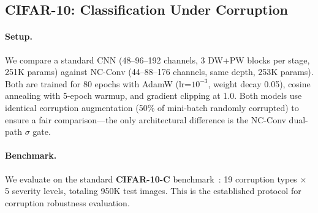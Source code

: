 \documentclass{bmvc2k}
\begin{document}
\subsection{CIFAR-10: Classification Under Corruption}

\paragraph{Setup.}
We compare a standard CNN (48--96--192 channels, 3 DW+PW blocks per stage, 251K params) against NC-Conv (44--88--176 channels, same depth, 253K params).
Both are trained for 80 epochs with AdamW (lr=$10^{-3}$, weight decay 0.05), cosine annealing with 5-epoch warmup, and gradient clipping at 1.0.
Both models use identical corruption augmentation (50\% of mini-batch randomly corrupted) to ensure a fair comparison---the only architectural difference is the NC-Conv dual-path $\sigma$ gate.

\paragraph{Benchmark.}
We evaluate on the standard \textbf{CIFAR-10-C} benchmark~\cite{hendrycks2019benchmarking}: 19 corruption types $\times$ 5 severity levels, totaling 950K test images.
This is the established protocol for corruption robustness evaluation.
\end{document}
